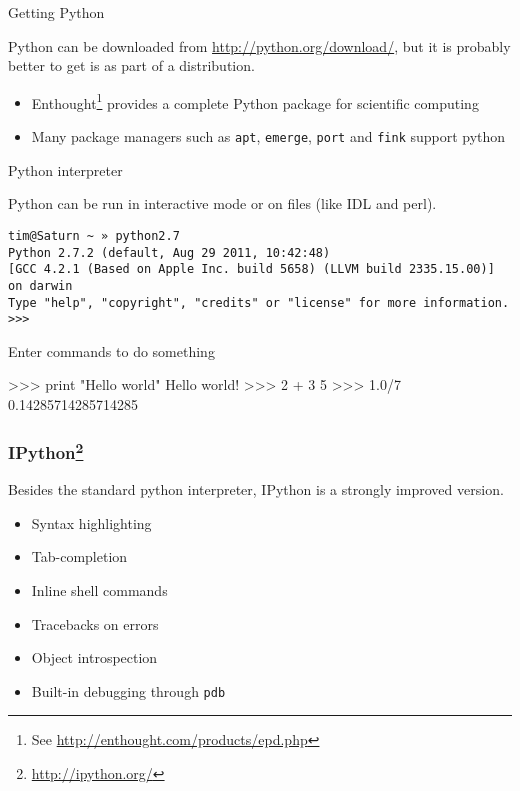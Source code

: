 \documentclass[xetex,10pt]{beamer}
\begin{document}
\begin{frame}[fragile]{Getting Python}
	
	Python can be downloaded from \url{http://python.org/download/}, but it is probably better to get is as part of a distribution.

	\vspace*{1em}

	\begin{itemize}
		\item Enthought\footnote[frame]{See \url{http://enthought.com/products/epd.php}} provides a complete Python package for scientific computing
		\item Many package managers such as \verb!apt!, \verb!emerge!, \verb!port! and \verb!fink! support python
	\end{itemize}
	
\end{frame}

\begin{frame}[fragile]{Python interpreter}
	
	Python can be run in interactive mode or on files (like IDL and perl).
	
\begin{verbatim}
tim@Saturn ~ » python2.7
Python 2.7.2 (default, Aug 29 2011, 10:42:48) 
[GCC 4.2.1 (Based on Apple Inc. build 5658) (LLVM build 2335.15.00)] on darwin
Type "help", "copyright", "credits" or "license" for more information.
>>> 
\end{verbatim}

Enter commands to do something

\begin{python}
>>> print "Hello world"
Hello world!
>>> 2 + 3
5
>>> 1.0/7
0.14285714285714285
\end{python}

\end{frame}

\begin{frame}[fragile]
	\frametitle{IPython\footnote[frame]{\url{http://ipython.org/}} }
	
	Besides the standard python interpreter, IPython is a strongly improved version.

	\vspace*{1em}

	\begin{itemize}
		\item Syntax highlighting
		\item Tab-completion
		\item Inline shell commands
		\item Tracebacks on errors
		\item Object introspection
		\item Built-in debugging through \verb!pdb!
	\end{itemize}
	
\end{frame}
\end{document}
